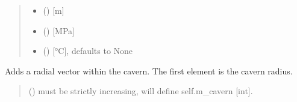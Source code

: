 \documentclass[letterpaper,10pt,english]{sphinxmanual}
\begin{document}
\begin{fulllineitems}
\begin{fulllineitems}
\begin{quote}
\begin{description}
\begin{itemize}
\item {} 
\sphinxAtStartPar
{} () \textendash{} {[}m{]}

\item {} 
\sphinxAtStartPar
{} () \textendash{} {[}MPa{]}

\item {} 
\sphinxAtStartPar
{} (\sphinxstyleliteralemphasis{\sphinxupquote{, }}) \textendash{} {[}°C{]}, defaults to None

\end{itemize}

\end{description}\end{quote}

\end{fulllineitems}


\begin{fulllineitems}
\label{\detokenize{tscw_module:tscw_module.tscw_DataClassesInput.GacaFieldData.add_cavernVector}}
\pysigstartsignatures
{}
\pysigstopsignatures
\sphinxAtStartPar
Adds a radial vector within the cavern. The first element is the cavern radius.
\begin{quote}\begin{description}
\sphinxAtStartPar
{} (\sphinxstyleliteralemphasis{\sphinxupquote{ {[}}}\sphinxstyleliteralemphasis{\sphinxupquote{{]}}}) \textendash{} must be strictly increasing, will define self.m\_cavern {[}int{]}.

\end{description}\end{quote}


\end{fulllineitems}
\end{fulllineitems}
\end{document}
